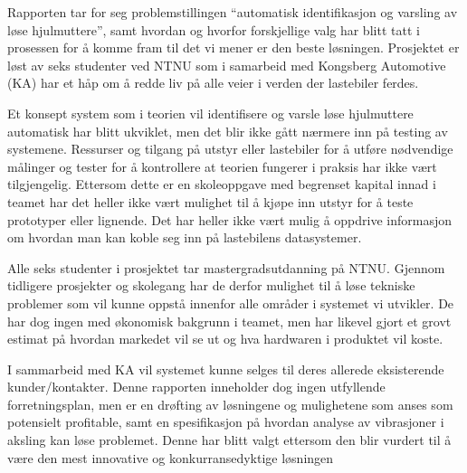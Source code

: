 Rapporten tar for seg problemstillingen ``automatisk identifikasjon og varsling av løse hjulmuttere'', samt hvordan og hvorfor forskjellige
valg har blitt tatt i prosessen for å komme fram til det vi mener er den beste løsningen. Prosjektet er løst av seks studenter ved NTNU
som i samarbeid med Kongsberg Automotive (KA) har et håp om å redde liv på alle veier i verden der lastebiler ferdes. 

Et konsept system som i teorien vil identifisere og varsle løse hjulmuttere automatisk har blitt ukviklet, men det blir ikke
gått nærmere inn på testing av systemene. Ressurser og tilgang på utstyr eller lastebiler for å utføre 
nødvendige målinger og tester for å kontrollere at teorien fungerer i praksis har ikke vært tilgjengelig. Ettersom dette er en skoleoppgave med begrenset
kapital innad i teamet har det heller ikke vært mulighet til å kjøpe inn utstyr for å teste prototyper eller lignende. Det har heller ikke 
vært mulig å oppdrive informasjon om hvordan man kan koble seg inn på lastebilens datasystemer.

Alle seks studenter i prosjektet tar mastergradsutdanning på NTNU. Gjennom tidligere prosjekter og skolegang har de derfor
mulighet til å løse tekniske problemer som vil kunne oppstå innenfor alle områder i systemet vi utvikler. De har dog ingen med
økonomisk bakgrunn i teamet, men har likevel gjort et grovt estimat på hvordan markedet vil se ut og hva hardwaren i produktet
vil koste.

I sammarbeid med KA vil systemet kunne selges til deres allerede eksisterende kunder/kontakter. Denne rapporten
inneholder dog ingen utfyllende forretningsplan, men er en drøfting av løsningene og mulighetene som anses som
potensielt profitable, samt en spesifikasjon på hvordan analyse av vibrasjoner i aksling kan løse problemet. Denne har blitt valgt ettersom den blir vurdert
til å være den mest innovative og konkurransedyktige løsningen
